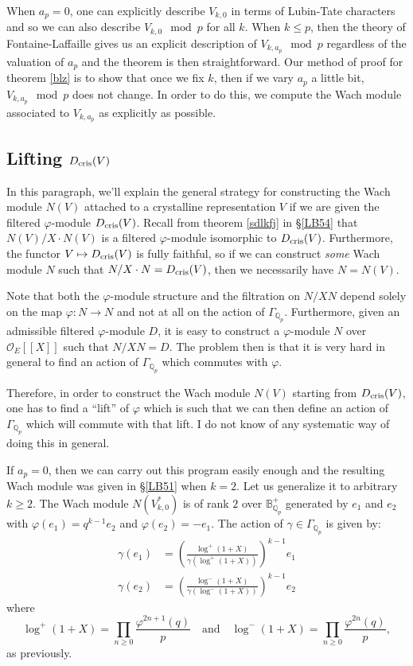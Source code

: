 \documentclass[11pt]{amsart}
\def\Q{{\mathbb Q}_p}
\def\O{{\mathcal O}_E}
\def\ra{\rightarrow}
\def\bplus{\mathbb{B}^+}
\def\dcris{D_{\rm cris}}
\begin{document}
When $a_p=0$, one can explicitly describe $V_{k,0}$ in terms of 
Lubin-Tate characters and so we can also describe $V_{k,0} \mod{p}$ 
for all $k$.  
When $k \leq p$, then the theory of Fontaine-Laffaille gives us 
an explicit description of $V_{k,a_p} \mod{p}$ regardless of the 
valuation of $a_p$ and the theorem is then straightforward. 
Our method of proof for theorem \ref{blz} is to show that  
once we fix $k$, then if we vary $a_p$ a little bit, $V_{k,a_p} \mod{p}$ 
does not change. In order to do this, we compute the Wach module  
associated to $V_{k,a_p}$ as explicitly as possible.  
 
\subsection{Lifting $\dcris(V)$} 
 
In this paragraph, we'll explain the general strategy for constructing 
the Wach module $N(V)$ attached to a crystalline representation $V$ if 
we are given the filtered $\varphi$-module $\dcris(V)$. Recall from theorem 
\ref{sdlkfj} in \S \ref{LB54} that $N(V) / X \cdot N(V)$ is a filtered 
$\varphi$-module isomorphic to $\dcris(V)$. Furthermore, the functor $V \mapsto 
\dcris(V)$ is fully faithful, so if we can construct \emph{some} Wach module  
$N$ such that $N / X \cdot N = \dcris(V)$, then we necessarily have $N=N(V)$.  
 
Note that both the $\varphi$-module structure and the filtration on  
$N/XN$ depend solely on the map $\varphi : N \ra N$ and not at all on 
the action of $\Gamma_{\Q}$. Furthermore, given an admissible filtered 
$\varphi$-module $D$, it is easy to construct  
a $\varphi$-module $N$ over $\O[[X]]$ such that $N/XN=D$.  
The problem then is that it is very hard in general to find an action 
of $\Gamma_{\Q}$ which commutes with $\varphi$.  
 
Therefore, in order to construct the Wach module $N(V)$  
starting from $\dcris(V)$,  
one has to find a ``lift'' of $\varphi$ which is such that we can then define 
an action of $\Gamma_{\Q}$ which will commute with that lift. I do not 
know of any systematic way of doing this in general. 
 
If $a_p=0$, then we can carry out this program easily enough  
and the resulting Wach module was given in \S \ref{LB51} when $k=2$. 
Let us generalize it to arbitrary $k \geq 2$.  
The Wach module $N(V_{k,0}^*)$ is of rank $2$ 
over $\bplus_{\Q}$ generated by $e_1$ and $e_2$ with 
$\varphi(e_1)=q^{k-1} e_2$ and $\varphi(e_2)= - e_1$. 
The action of $\gamma \in \Gamma_{\Q}$ 
is given by: 
\begin{align*}  
\gamma(e_1) & = \left(\frac{\log^+(1+X)}{\gamma(\log^+(1+X))} 
\right)^{k-1} e_1 \\ 
\gamma(e_2) & = \left(\frac{\log^-(1+X)}{\gamma(\log^-(1+X))}  
\right)^{k-1} e_2  
\end{align*}  
where \[ \log^+(1+X) =\prod_{n \geq 0} \frac{\varphi^{2n+1}(q)}{p}  
\quad\text{and}\quad 
\log^-(1+X) =\prod_{n \geq 0} \frac{\varphi^{2n}(q)}{p},  \] 
as previously.
 
\end{document}
